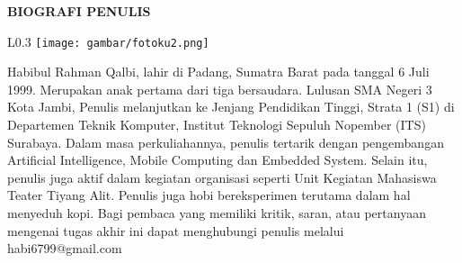 \begin{center}
  \Large
  \textbf{BIOGRAFI PENULIS}
\end{center}


\vspace{2ex}

\begin{wrapfigure}{L}{0.3\textwidth}
  \centering
  \vspace{-3ex}
  \texttt{[image: gambar/fotoku2.png]}
  \vspace{-4ex}
\end{wrapfigure}

Habibul Rahman Qalbi, lahir di Padang, Sumatra Barat pada tanggal 6 Juli 1999. Merupakan anak pertama dari tiga bersaudara. Lulusan SMA Negeri 3 Kota Jambi, Penulis melanjutkan ke Jenjang Pendidikan Tinggi, Strata 1 (S1) di Departemen Teknik Komputer, Institut Teknologi Sepuluh Nopember (ITS) Surabaya. Dalam masa perkuliahannya, penulis tertarik dengan pengembangan Artificial Intelligence, Mobile Computing dan Embedded System. Selain itu, penulis juga aktif dalam kegiatan organisasi seperti Unit Kegiatan Mahasiswa Teater Tiyang Alit. Penulis juga hobi bereksperimen terutama dalam hal menyeduh kopi. Bagi pembaca yang memiliki kritik, saran, atau pertanyaan mengenai tugas akhir ini dapat menghubungi penulis melalui habi6799@gmail.com
